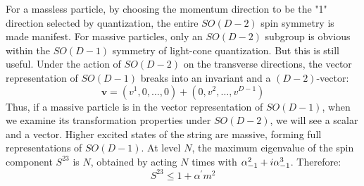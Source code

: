 For a massless particle, by choosing the momentum direction to be the "1" direction selected by quantization, the entire $SO(D-2)$ spin symmetry is made manifest. 
For massive particles, only an $SO(D-2)$ subgroup is obvious within the $SO(D-1)$ symmetry of light-cone quantization. But this is still useful. 
Under the action of $SO(D-2)$ on the transverse directions, the vector representation of $SO(D-1)$ breaks into an invariant and a $(D-2)$-vector: 
\begin{equation}
	\mathbf{v}=\left(v^{1}, 0, \ldots, 0\right)+\left(0, v^{2}, \ldots, v^{D-1}\right)
\end{equation}
Thus, if a massive particle is in the vector representation of $SO(D-1)$, when we examine its transformation properties under $SO(D-2)$, we will see a scalar and a vector. Higher excited states of the string are massive, forming full representations of $SO(D-1)$. 
At level $N$, the maximum eigenvalue of the spin component $S^{23}$ is $N$, obtained by acting $N$ times with $\alpha_{-1}^{2}+i \alpha_{-1}^{3}$. 
Therefore: 
\begin{equation}
	S^{23} \leq 1+\alpha^{\prime} m^{2}
\end{equation}

